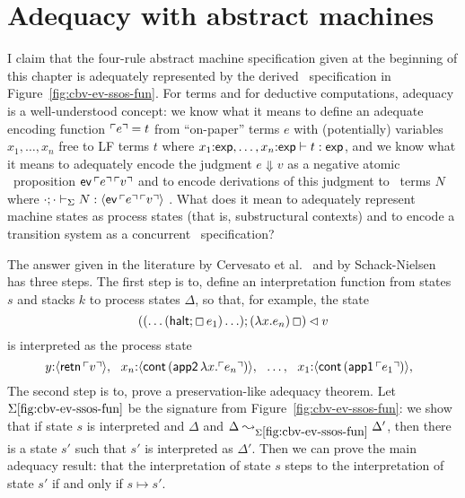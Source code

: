 





\section{Adequacy with abstract machines}
\label{sec:nat-ssos-adequacy}

I claim that the four-rule abstract machine specification given at the
beginning of this chapter is adequately represented by the derived
\sls~specification in Figure~\ref{fig:cbv-ev-ssos-fun}. For terms and
for deductive computations, adequacy is a well-understood concept: we
know what it means to define an adequate encoding function ${\ulcorner{e}\urcorner}
= t$ from ``on-paper'' terms $e$ with (potentially) variables
$x_1,\ldots,x_n$ free to LF terms $t$ where $x_1{:}{\sf
  exp},\ldots,x_n{:}{\sf exp} \vdash t : {\sf exp}$, and we know what
it means to adequately encode the judgment $e \Downarrow v$ as a
negative atomic \sls~proposition ${\sf ev}\,{\ulcorner{e}\urcorner}\,{\ulcorner{v}\urcorner}$
and to encode derivations of this judgment to \sls~terms $N$ where
${\cdot}; {\cdot} \vdash_{\Sigma} {N} : {\langle {{\sf
      ev}\,{\ulcorner{e}\urcorner}\,{\ulcorner{v}\urcorner}} \rangle}$
\cite{harper93framework,harper07mechanizing}. What does it mean to
adequately represent machine states as process states (that is,
substructural contexts) and to encode a transition system as a 
concurrent \sls~specification? 

The answer given in the literature by Cervesato et
al.~\cite{cervesato02concurrent} and by
Schack-Nielsen~\cite{schacknielsen07induction} has three steps. The
first step is to, define an interpretation function from states $s$
and stacks $k$ to process states $\Delta$, so that, for example, the
state
\[
((\ldots({\sf halt}; \Box\,e_1)\ldots); (\lambda x.e_n)\,\Box) \lhd v
\]
is interpreted as the process state
\[
y{:}\langle {{\sf retn}\,{\ulcorner{v}\urcorner}} \rangle, ~~
x_n{:}\langle {{\sf cont}\,({\sf app2}\,\lambda x.{\ulcorner{e_n}\urcorner})} \rangle, ~~
\ldots, ~~
x_1{:}\langle {{\sf cont}\,({\sf app1}\,{\ulcorner{e_1}\urcorner})} \rangle, ~~
\]
The second step is to, prove a preservation-like adequacy theorem. Let
$\Sigma\ref{fig:cbv-ev-ssos-fun}$ be the signature from
Figure~\ref{fig:cbv-ev-ssos-fun}: we show that if state $s$ is
interpreted and $\Delta$ and $\Delta
\leadsto_{\Sigma\ref{fig:cbv-ev-ssos-fun}} \Delta'$, then there is a
state $s'$ such that $s'$ is interpreted as $\Delta'$. Then we can
prove the main adequacy result: that the interpretation of state $s$
steps to the interpretation of state $s'$ if and only if $s \mapsto
s'$.

